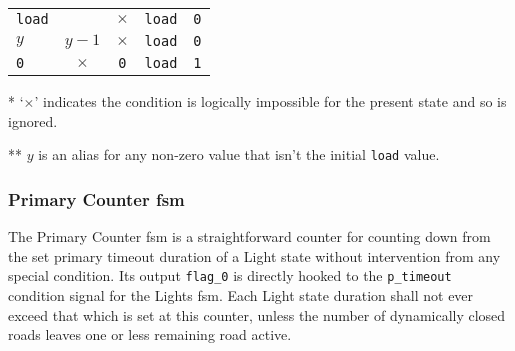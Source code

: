 \begin{table}[H]
\begin{threeparttable}
\begin{tabular}[t]{W{c}{2.8cm}cccW{c}{2cm}}
			\cmidrule(lr){1-1}\cmidrule(lr){2-4}\cmidrule(lr){5-5}
			\footnotesize\texttt{load}                                              & \footnotesize\ttfamily{} & $\times$\tnote{*}                                                     & \footnotesize\texttt{load}                                            & \texttt{0}                             \\
			$y$\tnote{**}                                                           & $y-1$                                                                                                                                                                                                                                                                                                                            & $\times$                                                              & \footnotesize\texttt{load}                                            & \texttt{0}                             \\
			\texttt{0}                                                              & $\times$                                                                                                                                                                                                                                                                                                                         & \texttt{0}                                                            & \footnotesize\texttt{load}                                            & \texttt{1}                             \\
			\bottomrule
		\end{tabular}
		\begin{tablenotes}\footnotesize
			\item[*] `$\times$' indicates the condition is logically impossible for the present state and so is ignored.
			\item[**] $y$ is an alias for any non-zero value that isn't the initial \texttt{load} value.
		\end{tablenotes}
	\end{threeparttable}
\end{table}
\subsubsection{Primary Counter \acs{fsm}}
The Primary Counter \ac{fsm} is a straightforward counter for counting down from the set primary timeout duration of a Light state without intervention from any special condition. Its output \texttt{flag\_0} is directly hooked to the \texttt{p\_timeout} condition signal for the Lights \ac{fsm}. Each Light state duration shall not ever exceed that which is set at this counter, unless the number of dynamically closed roads leaves one or less remaining road active.

